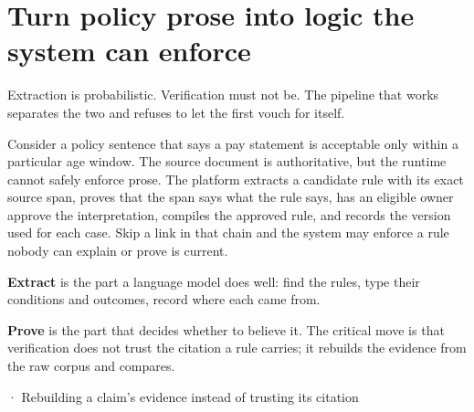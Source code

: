 \section{Turn policy prose into logic the system can enforce}

Extraction is probabilistic. Verification must not be. The pipeline that works separates the two and refuses to let the first vouch for itself.\par

Consider a policy sentence that says a pay statement is acceptable only within a particular age window. The source document is authoritative, but the runtime cannot safely enforce prose. The platform extracts a candidate rule with its exact source span, proves that the span says what the rule says, has an eligible owner approve the interpretation, compiles the approved rule, and records the version used for each case. Skip a link in that chain and the system may enforce a rule nobody can explain or prove is current.\par


\textbf{Extract} is the part a language model does well: find the rules, type their conditions and outcomes, record where each came from.\par

\textbf{Prove} is the part that decides whether to believe it. The critical move is that verification does not trust the citation a rule carries; it rebuilds the evidence from the raw corpus and compares.\par

\BookSnake · Rebuilding a claim's evidence instead of trusting its citation\par

